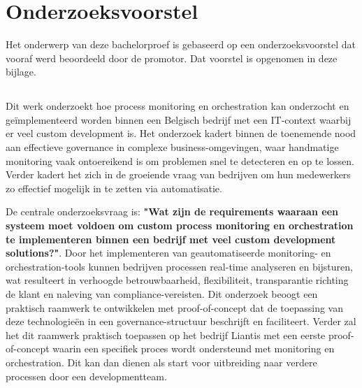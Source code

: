 \documentclass[dutch,dit,thesis]{hogentreport}
\begin{document}








\appendix

\chapter{Onderzoeksvoorstel}

Het onderwerp van deze bachelorproef is gebaseerd op een onderzoeksvoorstel dat vooraf werd beoordeeld door de promotor. Dat voorstel is opgenomen in deze bijlage.

\section{}%
\label{sec:onderzoeksvoorstel abstract}
Dit werk onderzoekt hoe process monitoring en orchestration kan onderzocht en geïmplementeerd worden binnen een Belgisch bedrijf met een IT-context waarbij er veel custom development is. Het onderzoek kadert binnen de toenemende nood aan effectieve governance in complexe business-omgevingen, waar handmatige monitoring vaak ontoereikend is om problemen snel te detecteren en op te lossen. Verder kadert het zich in de groeiende vraag van bedrijven om hun medewerkers zo effectief mogelijk in te zetten via automatisatie. \newline

De centrale onderzoeksvraag is: \textbf{"Wat zijn de requirements waaraan een systeem moet voldoen om custom process monitoring en orchestration te implementeren binnen een bedrijf met veel custom development solutions?"}. Door het implementeren van geautomatiseerde monitoring- en orchestration-tools kunnen bedrijven processen real-time analyseren en bijsturen, wat resulteert in verhoogde betrouwbaarheid, flexibiliteit, transparantie richting de klant en naleving van compliance-vereisten. Dit onderzoek beoogt een praktisch raamwerk te ontwikkelen met proof-of-concept dat de toepassing van deze technologieën in een governance-structuur beschrijft en faciliteert. Verder zal het dit raamwerk praktisch toepassen op het bedrijf Liantis met een eerste proof-of-concept waarin een specifiek proces wordt ondersteund met monitoring en orchestration. Dit kan dan dienen als start voor uitbreiding naar verdere processen door een developmentteam. \newline
\end{document}
